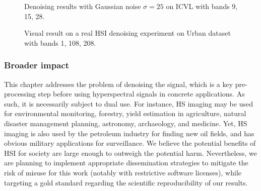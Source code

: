 \begin{table}[t]
   \centering
  \label{table:speed}
   
\end{table}
\begin{table}[t]
  \centering
    \label{table:unrolling}
	
\end{table}


\begin{figure}[h!]
  
        \caption{Denoising results with Gaussian noise $\sigma=25$ on ICVL with bands 9, 15, 28.}\label{fig:icvl}
\end{figure}

\begin{figure}[h!]
  
        \caption{Visual result on a real HSI denoising experiment on Urban dataset with bands 1, 108, 208.}\label{fig:urban}
\end{figure}


\subsubsection{Broader impact}

This chapter addresses the problem of denoising the signal, which is a key pre-processing step before using hyperspectral signals in concrete applications. 
As such, it is necessarily subject to dual use.
For instance, HS imaging may be used for environmental monitoring, forestry, yield estimation in agriculture, natural disaster management planning, astronomy, archaeology, and medicine.
Yet, HS imaging is also used by the petroleum industry for finding new oil fields, and has obvious military applications for surveillance.
We believe the potential benefits of HSI for society are large enough to outweigh the potential harm. 
Nevertheless, we are planning to implement appropriate dissemination strategies to mitigate the risk of misuse for this work (notably with restrictive software licenses), while targeting a gold standard regarding the scientific reproducibility of our results.


